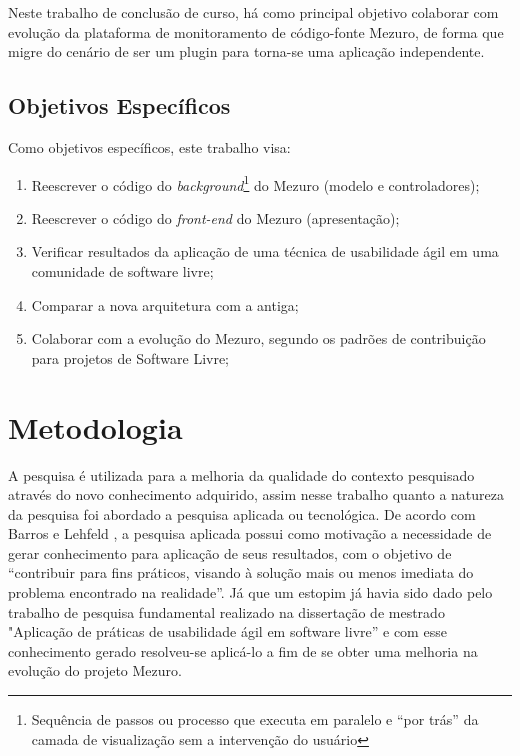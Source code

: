 Neste trabalho de conclusão de curso, há como principal objetivo colaborar com evolução da plataforma de monitoramento de código-fonte Mezuro, de forma que migre do cenário de ser um plugin para torna-se uma aplicação independente.

\subsection{Objetivos Específicos}

Como objetivos específicos, este trabalho visa:

\begin{enumerate}

\item Reescrever o código do \textit{background}\footnote{Sequência de passos ou processo que executa em paralelo e ``por trás'' da camada de visualização sem a intervenção do usuário} do Mezuro (modelo e controladores);
\item Reescrever o código do \textit{front-end} do Mezuro (apresentação);
\item Verificar resultados da aplicação de uma técnica de usabilidade ágil em uma comunidade de software livre;
\item Comparar a nova arquitetura com a antiga;
\item Colaborar com a evolução do Mezuro, segundo os padrões de contribuição para projetos de Software Livre;

\end{enumerate}

\section{Metodologia}

A pesquisa é utilizada para a melhoria da qualidade do contexto pesquisado através do novo conhecimento adquirido, assim nesse trabalho quanto a natureza da pesquisa foi abordado a pesquisa aplicada ou tecnológica. De acordo com Barros e Lehfeld \citeyear{barros2000}, a pesquisa aplicada possui como motivação a necessidade de gerar conhecimento para aplicação de seus resultados, com o objetivo de “contribuir para fins práticos, visando à solução mais ou menos imediata do problema encontrado na realidade”. Já que um estopim já havia sido dado pelo trabalho de pesquisa fundamental realizado na dissertação de mestrado "Aplicação de práticas de usabilidade ágil em software livre” \cite{santos2012} e com esse conhecimento gerado resolveu-se aplicá-lo a fim de se obter uma melhoria na evolução do projeto Mezuro.

